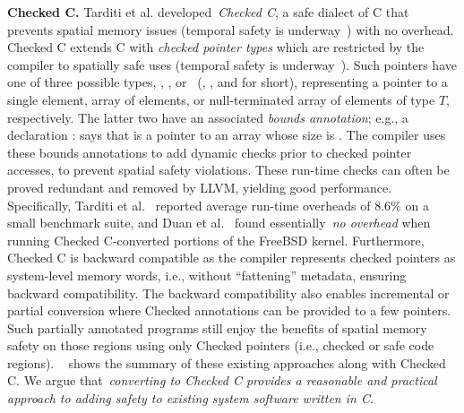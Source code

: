 {\noindent
\textbf{Checked C.} Tarditi et al. developed~\emph{Checked C}, a safe dialect of C that prevents spatial memory issues (temporal safety is underway~\cite{checkedc:temporal}) with no overhead.
Checked C extends C with \emph{checked pointer
  types} which are restricted by the compiler to spatially safe uses (temporal safety is underway~\cite{checkedc:temporal}).
Such pointers have one of three possible types, , ,
or~ (\ptr, \arr, and \ntarr{} for short), representing a
pointer to a single element, array of elements, or null-terminated
array of elements of type $T$, respectively. The latter two have an
associated \emph{bounds annotation}; e.g., a declaration 
 :  says that  is a pointer to an  array whose size is .
The compiler uses these bounds annotations to add dynamic checks prior to checked pointer accesses, to prevent spatial safety violations.
These run-time checks can often be proved redundant and removed by LLVM, yielding good performance.
Specifically, Tarditi et al.~\cite{tarditi2018checked} reported average
run-time overheads of 8.6\% on a small benchmark suite, and
Duan et al.~\cite{duanrefactoring} found essentially~\emph{no overhead} when running
Checked C-converted portions of the FreeBSD kernel.
Furthermore, Checked C is backward compatible as the compiler  represents checked pointers as system-level memory words, i.e., without
``fattening'' metadata, ensuring backward compatibility. 
The backward compatibility also enables incremental or partial conversion where Checked annotations can be provided to a few pointers.
Such partially annotated programs still enjoy the benefits of spatial memory safety on those regions using only Checked pointers (i.e., checked or safe code regions).
~ shows the summary of these existing approaches along with Checked C.
We argue that~\emph{converting to Checked C provides a reasonable and practical approach to adding safety to existing system software written in C}.
}

